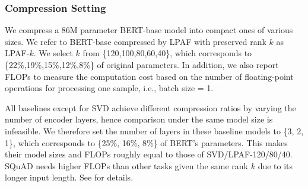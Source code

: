 \subsubsection{Compression Setting}

We compress a 86M parameter  BERT-base model into compact ones of various sizes. 
We refer to BERT-base compressed by  LPAF with preserved rank $k$ as LPAF-$k$. We select $k$ from \{120,100,80,60,40\}, which corresponds to \{22\%,19\%,15\%,12\%,8\%\} of original parameters. In addition, we also report FLOPs to measure the computation cost based on the number of floating-point operations for processing one sample, i.e., batch size = 1.

All baselines except for SVD achieve different compression ratios by 
varying the number 
of encoder layers, hence comparison under the same model size is infeasible. 
We therefore set the number of layers in these baseline models to \{3, 2, 1\}, 
which corresponds to \{25\%, 16\%, 8\%\} of BERT's parameters. 
This makes their model sizes and FLOPs roughly equal to those of SVD/LPAF-120/80/40. 
SQuAD needs higher FLOPs than other tasks given the same rank $k$ due to its longer input length. See  for details.


